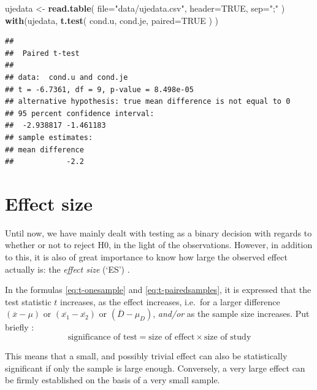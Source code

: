 \documentclass[
]{book}
\newenvironment{Shaded}{\begin{snugshade}}{\end{snugshade}}
\newcommand{\AttributeTok}[1]{\textcolor[rgb]{0.13,0.29,0.53}{#1}}
\newcommand{\ConstantTok}[1]{\textcolor[rgb]{0.56,0.35,0.01}{#1}}
\newcommand{\FunctionTok}[1]{\textcolor[rgb]{0.13,0.29,0.53}{\textbf{#1}}}
\newcommand{\NormalTok}[1]{#1}
\newcommand{\OtherTok}[1]{\textcolor[rgb]{0.56,0.35,0.01}{#1}}
\newcommand{\StringTok}[1]{\textcolor[rgb]{0.31,0.60,0.02}{#1}}
\begin{document}
\begin{Shaded}
\begin{Highlighting}[]
\NormalTok{ujedata }\OtherTok{\textless{}{-}} \FunctionTok{read.table}\NormalTok{( }\AttributeTok{file=}\StringTok{"data/ujedata.csv"}\NormalTok{, }\AttributeTok{header=}\ConstantTok{TRUE}\NormalTok{, }\AttributeTok{sep=}\StringTok{";"}\NormalTok{ )}
\FunctionTok{with}\NormalTok{(ujedata, }\FunctionTok{t.test}\NormalTok{( cond.u, cond.je, }\AttributeTok{paired=}\ConstantTok{TRUE}\NormalTok{ ) )}
\end{Highlighting}
\end{Shaded}

\begin{verbatim}
## 
##  Paired t-test
## 
## data:  cond.u and cond.je
## t = -6.7361, df = 9, p-value = 8.498e-05
## alternative hypothesis: true mean difference is not equal to 0
## 95 percent confidence interval:
##  -2.938817 -1.461183
## sample estimates:
## mean difference 
##            -2.2
\end{verbatim}

\section{Effect size}\label{sec:ttest-effectsize}

Until now, we have mainly dealt with testing as a binary
decision with regards to whether or not to reject H0, in the light
of the observations. However, in addition to this, it is also of great importance to know how large the observed effect actually is: the \emph{effect size} (`ES') \citep{Cohen88, Thom02, Naka07}.

In the formulas \eqref{eq:t-onesample} and \eqref{eq:t-pairedsamples}, it is expressed that the test statistic \(t\) increases,
as the effect increases,
i.e.~for a larger difference
\((\overline{x}-\mu)\) or \((\overline{x_1}-\overline{x_2})\) or
\((\overline{D}-\mu_D)\),
\emph{and/or} as the sample size increases.
Put briefly \citep[ p.338, formula 11.10]{Rose08}:
\begin{equation}
  \label{eq:Rose08}
    \textrm{significance of test} = 
    \textrm{size of effect} \times \textrm{size of study}
\end{equation}

This means
that a small, and possibly trivial effect can also be
statistically significant if only the sample is large enough.
Conversely, a very large effect can be firmly established on the basis of
a very small sample.
\end{document}

